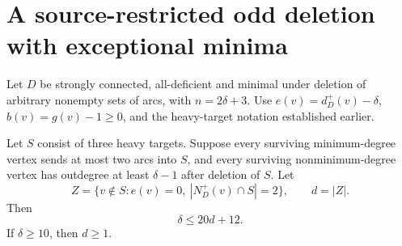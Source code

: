 \section{A source-restricted odd deletion with exceptional minima}
\label{sec:restricted-odd-capacity}

Let $D$ be strongly connected, all-deficient and minimal under deletion
of arbitrary nonempty sets of arcs, with $n=2\delta+3$.
Use $e(v)=d_D^+(v)-\delta$, $b(v)=g(v)-1\ge0$, and the heavy-target
notation established earlier.

\begin{lemma}
\label{lem:restricted-odd-degree}
Let $S$ consist of three heavy targets.  Suppose every surviving
minimum-degree vertex sends at most two arcs into $S$, and every
surviving nonminimum-degree vertex has outdegree at least $\delta-1$
after deletion of $S$.  Let
\[
 Z=\{v\notin S:e(v)=0,\ |N_D^+(v)\cap S|=2\},\qquad d=|Z|.
\]
Then
\begin{equation}\label{eq:restricted-odd-degree-bound}
 {\delta\le20d+12.}
\end{equation}
If $\delta\ge10$, then $d\ge1$.
\end{lemma}

